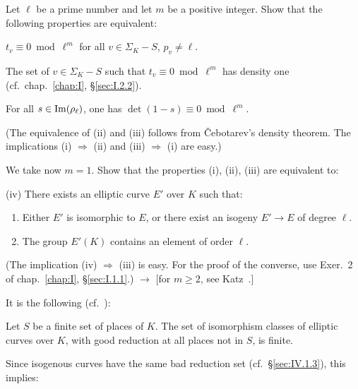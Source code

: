 \begin{alist}
\item Let $\ell$ be a prime number and let $m$ be a positive integer.
Show that the following properties are equivalent:
\begin{rlist}
\item $t_v \equiv 0 \bmod \ell^m$ for all $v \in \Sigma_K - S$,
$p_v \neq \ell$.
\item The set of $v \in \Sigma_K - S$ such that $t_v \equiv 0 \bmod
\ell^m$ has density one (cf.~chap.~\ref{chap:I},
\S\ref{sec:I.2.2}).
\item For all $s \in \mathrm{Im}(\rho_\ell)$, one has $\det(1-s) \equiv 0
\bmod \ell^m$.
\end{rlist}
(The equivalence of (ii) and (iii) follows from \v{C}ebotarev's
density theorem.  The implications (i) $\Rightarrow$ (ii) and (iii)
$\Rightarrow$ (i) are easy.)

\item We take now $m = 1$.  Show that the properties (i), (ii), (iii)
are equivalent to:

(iv) There exists an elliptic curve $E'$ over $K$ such that:
\begin{enumerate}[leftmargin=2.2em,itemsep=0.15ex,topsep=0.4ex]
\item[$(\alpha)$] Either $E'$ is isomorphic to $E$, or there exist an
isogeny $E' \longrightarrow E$ of degree $\ell$.
\item[$(\beta)$] The group $E'(K)$ contains an element of order
$\ell$.
\end{enumerate}
(The implication (iv) $\Rightarrow$ (iii) is easy.  For the proof of
the converse, use Exer.~2 of chap.~\ref{chap:I},
\S\ref{sec:I.1.1}.) $\longrightarrow$ [for $m \geq 2$, see
Katz~\cite{katz-torsion}.]
\end{alist}


It is the following (cf.~\cite{safarevic}):

\begin{theorem}
Let $S$ be a finite set of places of $K$.  The set of isomorphism
classes of elliptic curves over $K$, with good reduction at all places
not in $S$, is finite.
\end{theorem}

Since isogenous curves have the same bad reduction set
(cf.~\S\ref{sec:IV.1.3}), this implies:

